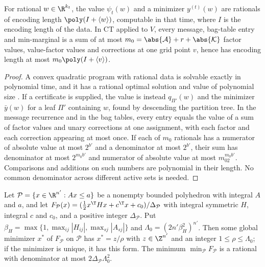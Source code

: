 \begin{lemma}\label{lem:cv-bits}
For rational $w\in\R^{k_t}$, the value $\psi_t(w)$ and a minimizer
$y^{(t)}(w)$ are rationals of encoding length $\poly(I+\langle w\rangle)$,
computable in that time, where $I$ is the encoding length of the data. In
CT applied to $V$, every message, bag-table entry and min-marginal is a sum
of at most $m_0=\abs{\mathcal A}+r+\abs{\mathcal K}$ factor values,
value-factor values and corrections at one grid point $v$, hence has
encoding length at most $m_0\poly(I+\langle v\rangle)$.
\end{lemma}

\begin{proof}
A convex quadratic program with rational data is solvable exactly in
polynomial time, and it has a rational optimal solution and value of
polynomial size \cite{KozlovTarasovKhachiyan1980}. If a certificate is
supplied, the value is instead $q_{\Pi'}(w)$ and the minimizer
$\bar y(w)$ for a leaf $\Pi'$ containing $w$, found by descending the
partition tree. In the message recurrence and in the bag tables, every entry
equals the value of a sum of factor values and unary corrections at one
assignment, with each factor and each correction appearing at most once. If
each of $m_0$ rationals has a numerator of absolute value at most $2^{b'}$
and a denominator at most $2^{b'}$, their sum has denominator at most
$2^{m_0b'}$ and numerator of absolute value at most $m_02^{m_0b'}$.
Comparisons and additions on such numbers are polynomial in their length. No
common denominator across different active sets is needed.
\end{proof}

\begin{lemma}\label{lem:cv-height}
Let $\mathcal P=\{x\in\R^{n'}:Ax\le a\}$ be a nonempty bounded polyhedron
with integral $A$ and $a$, and let
$F_{\mathcal P}(x)=(\frac12x^{\T}Hx+c^{\T}x+c_0)/\Delta_{\mathcal P}$ with
integral symmetric $H$, integral $c$ and $c_0$, and a positive integer
$\Delta_{\mathcal P}$. Put
$\beta_H=\max\{1,\max_{ij}|H_{ij}|,\max_{sj}|A_{sj}|\}$ and
$\Lambda_0=(2n'\beta_H^2)^{n'}$. Then some global minimizer $x^*$ of
$F_{\mathcal P}$ on $\mathcal P$ has $x^*=z/\rho$ with $z\in\Z^{n'}$ and an
integer $1\le\rho\le\Lambda_0$; if the minimizer is unique, it has this
form. The minimum $\min_{\mathcal P}F_{\mathcal P}$ is a rational with
denominator at most $2\Delta_{\mathcal P}\Lambda_0^2$.
\end{lemma}

